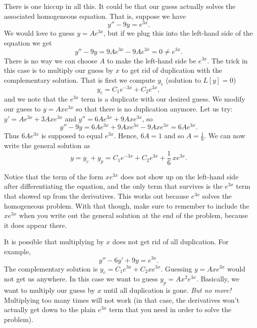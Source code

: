 \documentclass{ximera}
\begin{document}
There is one hiccup in all this.  It could be that our guess actually solves the associated homogeneous equation.  That is, suppose we have
\begin{equation*}
    y'' - 9y = e^{3x} .
\end{equation*}
We would love to guess $y = Ae^{3x}$, but if we plug this into the left-hand side of the equation we get
\begin{equation*}
    y''-9y = 9Ae^{3x} - 9Ae^{3x} = 0 \not= e^{3x} .
\end{equation*}
There is no way we can choose $A$ to make the left-hand side be $e^{3x}$. The trick in this case is to multiply our guess by $x$ to get rid of duplication with the complementary solution.  That is first we compute $y_c$ (solution to $L[y] = 0$)
\begin{equation*}
    y_c = C_1 e^{-3x} + C_2 e^{3x} ,
\end{equation*}
and we note that the $e^{3x}$ term is a duplicate with our desired guess. We modify our guess to $y = Axe^{3x}$ so that there is no duplication anymore.  Let us try: $y' = Ae^{3x} + 3Axe^{3x}$ and  $y'' = 6Ae^{3x} + 9Axe^{3x}$, so
\begin{equation*}
    y'' -9y = 6Ae^{3x} + 9Axe^{3x} - 9Axe^{3x} = 6Ae^{3x} .
\end{equation*}
Thus $6Ae^{3x}$ is supposed to equal $e^{3x}$.  Hence, $6A = 1$ and so $A=\frac{1}{6}$.  We can now write the general solution as
\begin{equation*}
    y = y_c + y_p =  C_1 e^{-3x} + C_2 e^{3x} + \frac{1}{6}\,xe^{3x} .
\end{equation*}

Notice that the term of the form $xe^{3x}$ does not show up on the left-hand side after differentiating the equation, and the only term that survives is the $e^{3x}$ term that showed up from the derivatives. This works out because $e^{3x}$ solves the homogeneous problem. With that though, make sure to remember to include the $xe^{3x}$ when you write out the general solution at the end of the problem, because it does appear there.

It is possible that multiplying by $x$ does not get rid of all duplication.  For example,
\begin{equation*}
    y''-6y'+9y = e^{3x} .
\end{equation*}
The complementary solution is $y_c = C_1 e^{3x} + C_2 x e^{3x}$.  Guessing $y=A xe^{3x}$ would not get us anywhere.  In this case we want to guess $y_p = Ax^2e^{3x}$. Basically, we want to multiply our guess by $x$ until all duplication is gone.  \emph{But no more!}  Multiplying too many times will not work (in that case, the derivatives won't actually get down to the plain $e^{3x}$ term that you need in order to solve the problem).
\end{document}
